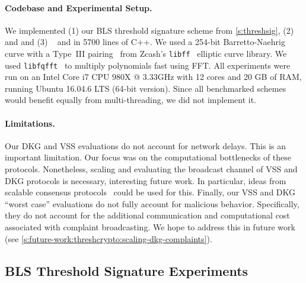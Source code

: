 \paragraph{Codebase and Experimental Setup.}
We implemented (1) our BLS threshold signature scheme from \cref{s:threshsig}, (2) \ejfdkg~\cite{Kate2010} and \ourdkg and (3) \evss~\cite{KZG10a} and \ourvss in 5700 lines of C++.
We used a 254-bit Barretto-Naehrig curve with a Type~III pairing~\cite{bn-curve} from Zcash's \texttt{libff}~\cite{libff} elliptic curve library.
We used \texttt{libfqfft}~\cite{libfqfft} to multiply polynomials fast using FFT.
All experiments were run on an Intel Core i7 CPU 980X @ 3.33GHz with 12 cores and 20 GB of RAM, running Ubuntu 16.04.6 LTS (64-bit version).
Since all benchmarked schemes would benefit equally from multi-threading, we did not implement it.

\paragraph{Limitations.}
Our DKG and VSS evaluations do not account for network delays.
This is an important limitation.
Our focus was on the computational bottlenecks of these protocols.
Nonetheless, scaling and evaluating the broadcast channel of VSS and DKG protocols is necessary, interesting future work.
In particular, ideas from scalable consensus protocols~\cite{algorand} could be used for this.
Finally, our VSS and DKG ``worst case'' evaluations do not fully account for malicious behavior.
Specifically, they do not account for the additional communication and computational cost associated with complaint broadcasting.
We hope to address this in future work (see \cref{s:future-work:threshcrypto:scaling-dkg-complaints}).

\subsection{BLS Threshold Signature Experiments}
\label{s:eval:threshsig}

